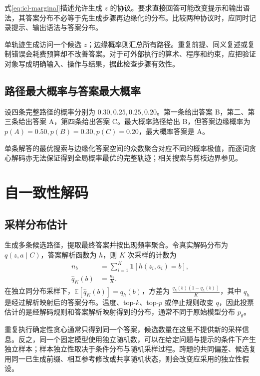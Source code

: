 \documentclass[../textbook.tex]{subfiles}
\begin{document}
式\eqref{eq:icl-marginal}描述允许生成 $z$ 的协议。要求直接回答可能改变提示和输出语法，其答案分布不必等于先生成步骤再边缘化的分布。比较两种协议时，应同时记录提示、输出语法与答案分布。

单轨迹生成访问一个候选 $z$；边缘概率则汇总所有路径。重复前提、同义复述或复制错误会耗费预算却不改善答案。对于可外部执行的算术、程序和约束，应把验证对象写成明确输入、操作与结果，据此检查步骤有效性。

\subsection{路径最大概率与答案最大概率}
设四条完整路径的概率分别为 $0.30,0.25,0.25,0.20$。第一条给出答案 B，第二、第三条给出答案 A，第四条给出答案 C。最大概率路径给出 B，但答案边缘概率为 $p(A)=0.50,p(B)=0.30,p(C)=0.20$，最大概率答案是 A。

单条解答的最优搜索与边缘化答案空间的众数聚合对应不同的概率极值，而逐词贪心解码亦无法保证得到全局概率最优的完整轨迹；相关搜索与剪枝边界参见。

\section{自一致性解码}

\subsection{采样分布估计}
生成多条候选路径，提取最终答案并按出现频率聚合\cite{wang2022selfconsistency}。令真实解码分布为 $q(z,a\mid C)$，答案解析函数为 $h$，则 $K$ 次采样的计数为
\begin{equation}
 \begin{aligned}
  n_b &= \sum_{i=1}^{K}\mathbf1[h(z_i,a_i)=b], \\
  \widehat q_K(b) &= \frac{n_b}{K}.
 \end{aligned}
\end{equation}
在独立同分布采样下，$\mathbb E[\widehat q_K(b)]=q_h(b)$，方差为 $\frac{q_h(b)(1-q_h(b))}{K}$，其中 $q_h$ 是经过解析映射后的答案分布。温度、top-$k$、top-$p$ 或停止规则改变 $q$，因此投票估计的是经解码规则和答案解析映射得到的分布，通常不同于原始模型分布 $p_\theta$。

重复执行确定性贪心通常只得到同一个答案，候选数量在这里不提供新的采样信息。反之，同一个固定模型使用独立随机数，可以在给定问题与提示的条件下产生独立样本；样本独立性取决于条件分布与随机采样过程。跨题的共同偏差、候选复用同一已生成前缀、相互参考修改或共享随机状态，则会改变应采用的独立性假设。
\end{document}
